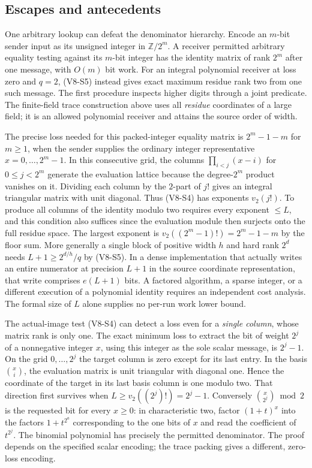 \documentclass[11pt,a4paper]{article}
\begin{document}
\subsection{Escapes and antecedents}\label{v8-escapes-and-antecedents}

One arbitrary lookup can defeat the denominator hierarchy. Encode an
\(m\)-bit sender input as its unsigned integer in \(\mathbb Z/2^m\). A
receiver permitted arbitrary equality testing against its \(m\)-bit
integer has the identity matrix of rank \(2^m\) after one message, with
\(O(m)\) bit work. For an integral polynomial receiver at loss zero and
\(q=2\), (V8-S5) instead gives exact maximum residue rank two from one such
message. The first procedure inspects higher digits through a joint
predicate. The finite-field trace construction above uses all
\emph{residue} coordinates of a large field; it is an allowed polynomial
receiver and attains the source order of width.

The precise loss needed for this packed-integer equality matrix is
\textbf{\(2^m-1-m\)} for \(m\ge1\), when the sender supplies the
ordinary integer representative \(x=0,\ldots,2^m-1\). In this
consecutive grid, the columns \(\prod_{i<j}(x-i)\) for \(0\le j<2^m\)
generate the evaluation lattice because the degree-\(2^m\) product
vanishes on it. Dividing each column by the \(2\)-part of \(j!\) gives
an integral triangular matrix with unit diagonal. Thus (V8-S4) has
exponents \(v_2(j!)\). To produce all columns of the identity modulo two
requires every exponent \(\le L\), and this condition also suffices
since the evaluation module then surjects onto the full residue space.
The largest exponent is \(v_2((2^m-1)!)=2^m-1-m\) by the floor sum. More
generally a single block of positive width \(h\) and hard rank \(2^d\)
needs \(L+1\ge 2^{d/h}/q\) by (V8-S5). In a dense implementation that
actually writes an entire numerator at precision \(L+1\) in the source
coordinate representation, that write comprises \(e(L+1)\) bits. A
factored algorithm, a sparse integer, or a different execution of a
polynomial identity requires an independent cost analysis. The formal
size of \(L\) alone supplies no per-run work lower bound.

The actual-image test (V8-S4) can detect a loss even for a \emph{single
column}, whose matrix rank is only one. The exact minimum loss to
extract the bit of weight \(2^j\) of a nonnegative integer \(x\), using
this integer as the sole scalar message, is \(2^j-1\). On the grid
\(0,\ldots,2^j\) the target column is zero except for its last entry. In
the basis \(\binom{x}{i}\), the evaluation matrix is unit triangular
with diagonal one. Hence the coordinate of the target in its last basis
column is one modulo two. That direction first survives when
\(L\ge v_2((2^j)!)=2^j-1\). Conversely \(\binom{x}{2^j}\bmod 2\) is the
requested bit for every \(x\ge0\): in characteristic two, factor
\((1+t)^x\) into the factors \(1+t^{2^a}\) corresponding to the one bits
of \(x\) and read the coefficient of \(t^{2^j}\). The binomial
polynomial has precisely the permitted denominator. The proof depends on
the specified scalar encoding; the trace packing gives a different,
zero-loss encoding.
\end{document}
